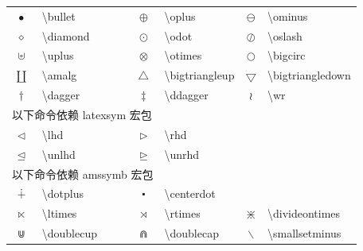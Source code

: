 \documentclass[a4paper]{ctexart}
\begin{document}
\begin{table}[H]
\begin{tabular}{clclcl}
            $\bullet$           & \textbackslash bullet     & $\oplus$              & \textbackslash oplus              &
            $\ominus$           & \textbackslash ominus                                                                 \\
            $\diamond$          & \textbackslash diamond    & $\odot$               & \textbackslash odot               &
            $\oslash$           & \textbackslash oslash                                                                 \\
            $\uplus$            & \textbackslash uplus      & $\otimes$             & \textbackslash otimes             &
            $\bigcirc$          & \textbackslash bigcirc                                                                \\
            $\amalg$            & \textbackslash amalg      & $\bigtriangleup$      & \textbackslash bigtriangleup      &
            $\bigtriangledown$  & \textbackslash bigtriangledown                                                        \\
            $\dagger$           & \textbackslash dagger     & $\ddagger$            & \textbackslash ddagger            &
            $\wr$               & \textbackslash wr                                                                     \\
            \midrule
            \multicolumn{3}{l}{以下命令依赖 latexsym 宏包} \\
            $\lhd$              & \textbackslash lhd        & $\rhd$                & \textbackslash rhd                \\
            $\unlhd$            & \textbackslash unlhd      & $\unrhd$              & \textbackslash unrhd              \\
            \midrule
            \multicolumn{3}{l}{以下命令依赖 amssymb 宏包} \\
            $\dotplus$          & \textbackslash dotplus        & $\centerdot$      & \textbackslash centerdot          \\
            $\ltimes$           & \textbackslash ltimes         & $\rtimes$         & \textbackslash rtimes             &
            $\divideontimes$    & \textbackslash divideontimes                                                          \\
            $\doublecup$        & \textbackslash doublecup      & $\doublecap$      & \textbackslash doublecap          &
            $\smallsetminus$    & \textbackslash smallsetminus                                                          \\

\end{tabular}
\end{table}
\end{document}
